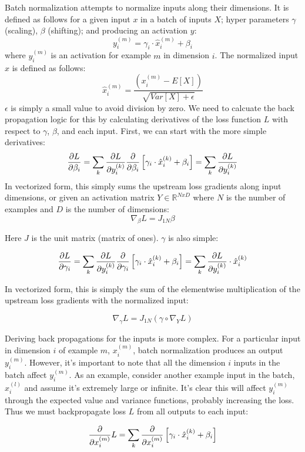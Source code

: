 \documentclass[]{article}
\newcommand{\derivop}[1]{%
	\ensuremath{\frac{\partial}{\partial {#1}}}}
\newcommand{\deriv}[2]{%
	\ensuremath{\frac{\partial {#1}}{\partial {#2}}}}
\newcommand{\slayer}[3]{ %
	\ensuremath{{#1}^{(#2)}_{#3}}}
\begin{document}
Batch normalization attempts to normalize inputs along their dimensions. It is defined as follows for a given input $x$ in a batch of inputs $X$; hyper parameters $\gamma$ (scaling), $\beta$ (shifting); and producing an activation $y$:
$$\slayer{y}{m}{i}=\gamma_i \cdot \slayer{\hat{x}}{m}{i} + \beta_i$$
where $\slayer{y}{m}{i}$ is an activation for example $m$ in dimension $i$. The normalized input $\hat{x}$ is defined as follows:
$$\slayer{\hat{x}}{m}{i} = \frac{(\slayer{x}{m}{i} - E[X])}{\sqrt{Var[X] + \epsilon}}$$
$\epsilon$ is simply a small value to avoid division by zero. We need to calcuate the back propagation logic for this by calculating derivatives of the loss function $L$ with respect to $\gamma$, $\beta$, and each input. First, we can start with the more simple derivatives:
$$\deriv{L}{\beta_i} = \sum_{k} \deriv{L}{\slayer{y}{k}{i}} \derivop{\beta_i}\left[ \gamma_i \cdot \slayer{\hat{x}}{k}{i} + \beta_i\right] = \sum_{k} \deriv{L}{\slayer{y}{k}{i}}$$
In vectorized form, this simply sums the upstream loss gradients along input dimensions, or given an activation matrix $Y \in \mathbb{R}^{NxD}$ where $N$ is the number of examples and $D$ is the number of dimensions:
$$\nabla_\beta L = J_{1N}\beta$$

Here $J$ is the unit matrix (matrix of ones). $\gamma$ is also simple:

$$\deriv{L}{\gamma_i} = \sum_{k} \deriv{L}{\slayer{y}{k}{i}} \derivop{\gamma_i}\left[ \gamma_i \cdot \slayer{\hat{x}}{k}{i} + \beta_i\right] = \sum_{k} \deriv{L}{\slayer{y}{k}{i}} \cdot \slayer{\hat{x}}{k}{i}$$

In vectorized form, this is simply the sum of the elementwise multiplication of the upstream loss gradients with the normalized input:

$$\nabla_\gamma L = J_{1N}(\gamma \circ \nabla_{Y}L)$$

Deriving back propagations for the inputs is more complex. For a particular input in dimension $i$ of example $m$, $\slayer{x}{m}{i}$, batch normalization produces an output $\slayer{y}{m}{i}$. However, it's important to note that all the dimension $i$ inputs in the batch affect $\slayer{y}{m}{i}$. As an example, consider another example input in the batch, $\slayer{x}{l}{i}$ and assume it's extremely large or infinite. It's clear this will affect $\slayer{y}{m}{i}$ through the expected value and variance functions, probably increasing the loss. Thus we must backpropagate loss $L$ from all outputs to each input:

$$\derivop{\slayer{x}{m}{i}}L = \sum_k \derivop{\slayer{x}{m}{i}}\left[\gamma_i \cdot \slayer{\hat{x}}{k}{i} + \beta_i\right]$$
\end{document}

